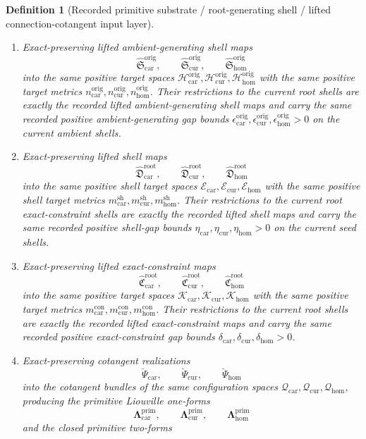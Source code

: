 \documentclass[11pt]{article}
\newcommand{\TensorShellTarget}{\mathcal E_{\mathrm{car}}}
\newcommand{\CurShellTarget}{\mathcal E_{\mathrm{cur}}}
\newcommand{\HomShellTarget}{\mathcal E_{\mathrm{hom}}}
\newcommand{\TensorShellMetric}{m_{\mathrm{car}}^{\mathrm{sh}}}
\newcommand{\CurShellMetric}{m_{\mathrm{cur}}^{\mathrm{sh}}}
\newcommand{\HomShellMetric}{m_{\mathrm{hom}}^{\mathrm{sh}}}
\newcommand{\TensorShellGap}{\eta_{\mathrm{car}}}
\newcommand{\CurShellGap}{\eta_{\mathrm{cur}}}
\newcommand{\HomShellGap}{\eta_{\mathrm{hom}}}
\newcommand{\TensorConstraintTarget}{\mathcal K_{\mathrm{car}}}
\newcommand{\CurConstraintTarget}{\mathcal K_{\mathrm{cur}}}
\newcommand{\HomConstraintTarget}{\mathcal K_{\mathrm{hom}}}
\newcommand{\TensorConstraintMetric}{m_{\mathrm{car}}^{\mathrm{con}}}
\newcommand{\CurConstraintMetric}{m_{\mathrm{cur}}^{\mathrm{con}}}
\newcommand{\HomConstraintMetric}{m_{\mathrm{hom}}^{\mathrm{con}}}
\newcommand{\TensorConstraintGap}{\delta_{\mathrm{car}}}
\newcommand{\CurConstraintGap}{\delta_{\mathrm{cur}}}
\newcommand{\HomConstraintGap}{\delta_{\mathrm{hom}}}
\newcommand{\TensorConfigSpace}{\mathcal Q_{\mathrm{car}}}
\newcommand{\CurConfigSpace}{\mathcal Q_{\mathrm{cur}}}
\newcommand{\HomConfigSpace}{\mathcal Q_{\mathrm{hom}}}
\newcommand{\TensorOriginTarget}{\mathcal H_{\mathrm{car}}^{\mathrm{orig}}}
\newcommand{\CurOriginTarget}{\mathcal H_{\mathrm{cur}}^{\mathrm{orig}}}
\newcommand{\HomOriginTarget}{\mathcal H_{\mathrm{hom}}^{\mathrm{orig}}}
\newcommand{\TensorOriginTargetMetric}{n_{\mathrm{car}}^{\mathrm{orig}}}
\newcommand{\CurOriginTargetMetric}{n_{\mathrm{cur}}^{\mathrm{orig}}}
\newcommand{\HomOriginTargetMetric}{n_{\mathrm{hom}}^{\mathrm{orig}}}
\newcommand{\TensorOriginGap}{\epsilon_{\mathrm{car}}^{\mathrm{orig}}}
\newcommand{\CurOriginGap}{\epsilon_{\mathrm{cur}}^{\mathrm{orig}}}
\newcommand{\HomOriginGap}{\epsilon_{\mathrm{hom}}^{\mathrm{orig}}}
\newcommand{\TensorPrimitiveLiftedAmbientSection}{\widehat{\mathfrak S}_{\mathrm{car}}^{\mathrm{orig}}}
\newcommand{\CurPrimitiveLiftedAmbientSection}{\widehat{\mathfrak S}_{\mathrm{cur}}^{\mathrm{orig}}}
\newcommand{\HomPrimitiveLiftedAmbientSection}{\widehat{\mathfrak S}_{\mathrm{hom}}^{\mathrm{orig}}}
\newcommand{\TensorPrimitiveLiftedShellSection}{\widehat{\mathfrak D}_{\mathrm{car}}^{\mathrm{root}}}
\newcommand{\CurPrimitiveLiftedShellSection}{\widehat{\mathfrak D}_{\mathrm{cur}}^{\mathrm{root}}}
\newcommand{\HomPrimitiveLiftedShellSection}{\widehat{\mathfrak D}_{\mathrm{hom}}^{\mathrm{root}}}
\newcommand{\TensorPrimitiveConstraintMap}{\widehat{\mathfrak C}_{\mathrm{car}}^{\mathrm{root}}}
\newcommand{\CurPrimitiveConstraintMap}{\widehat{\mathfrak C}_{\mathrm{cur}}^{\mathrm{root}}}
\newcommand{\HomPrimitiveConstraintMap}{\widehat{\mathfrak C}_{\mathrm{hom}}^{\mathrm{root}}}
\newcommand{\TensorPrimitiveCotangentRealization}{\breve\Psi_{\mathrm{car}}}
\newcommand{\CurPrimitiveCotangentRealization}{\breve\Psi_{\mathrm{cur}}}
\newcommand{\HomPrimitiveCotangentRealization}{\breve\Psi_{\mathrm{hom}}}
\newcommand{\TensorPrimitiveLiouville}{\boldsymbol{\Lambda}_{\mathrm{car}}^{\mathrm{prim}}}
\newcommand{\CurPrimitiveLiouville}{\boldsymbol{\Lambda}_{\mathrm{cur}}^{\mathrm{prim}}}
\newcommand{\HomPrimitiveLiouville}{\boldsymbol{\Lambda}_{\mathrm{hom}}^{\mathrm{prim}}}
\newtheorem{definition}{Definition}
\begin{document}
\begin{definition}[Recorded primitive substrate / root-generating shell / lifted connection-cotangent input layer]
\begin{enumerate}
    \item Exact-preserving lifted ambient-generating shell maps
    \[
    \TensorPrimitiveLiftedAmbientSection,\qquad
    \CurPrimitiveLiftedAmbientSection,\qquad
    \HomPrimitiveLiftedAmbientSection
    \]
    into the same positive target spaces \(\TensorOriginTarget,\CurOriginTarget,\HomOriginTarget\) with the same positive target metrics \(\TensorOriginTargetMetric,\CurOriginTargetMetric,\HomOriginTargetMetric\). Their restrictions to the current root shells are exactly the recorded lifted ambient-generating shell maps and carry the same recorded positive ambient-generating gap bounds \(\TensorOriginGap,\CurOriginGap,\HomOriginGap>0\) on the current ambient shells.
    \item Exact-preserving lifted shell maps
    \[
    \TensorPrimitiveLiftedShellSection,\qquad
    \CurPrimitiveLiftedShellSection,\qquad
    \HomPrimitiveLiftedShellSection
    \]
    into the same positive shell target spaces \(\TensorShellTarget,\CurShellTarget,\HomShellTarget\) with the same positive shell target metrics \(\TensorShellMetric,\CurShellMetric,\HomShellMetric\). Their restrictions to the current root exact-constraint shells are exactly the recorded lifted shell maps and carry the same recorded positive shell-gap bounds \(\TensorShellGap,\CurShellGap,\HomShellGap>0\) on the current seed shells.
    \item Exact-preserving lifted exact-constraint maps
    \[
    \TensorPrimitiveConstraintMap,\qquad
    \CurPrimitiveConstraintMap,\qquad
    \HomPrimitiveConstraintMap
    \]
    into the same positive target spaces \(\TensorConstraintTarget,\CurConstraintTarget,\HomConstraintTarget\) with the same positive target metrics \(\TensorConstraintMetric,\CurConstraintMetric,\HomConstraintMetric\). Their restrictions to the current root shells are exactly the recorded lifted exact-constraint maps and carry the same recorded positive exact-constraint gap bounds \(\TensorConstraintGap,\CurConstraintGap,\HomConstraintGap>0\).
    \item Exact-preserving cotangent realizations
    \[
    \TensorPrimitiveCotangentRealization,\qquad
    \CurPrimitiveCotangentRealization,\qquad
    \HomPrimitiveCotangentRealization
    \]
    into the cotangent bundles of the same configuration spaces \(\TensorConfigSpace,\CurConfigSpace,\HomConfigSpace\), producing the primitive Liouville one-forms
    \[
    \TensorPrimitiveLiouville,\qquad
    \CurPrimitiveLiouville,\qquad
    \HomPrimitiveLiouville
    \]
    and the closed primitive two-forms

\end{enumerate}
\end{definition}
\end{document}
